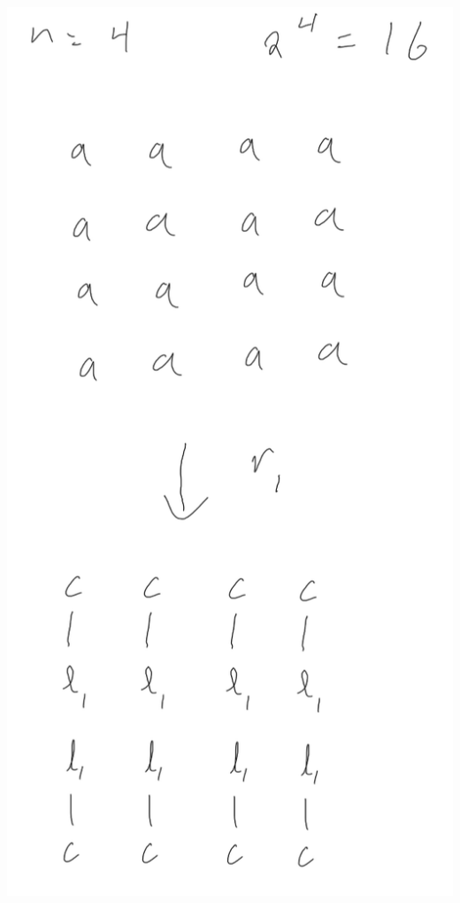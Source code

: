 \documentclass[]{article}
\numberwithin{equation}{section}
\begin{document}
\begin{multicols}{3}
    \includegraphics[width=\columnwidth]{figs/pblm6_4a.png}

\end{multicols}
\end{document}
